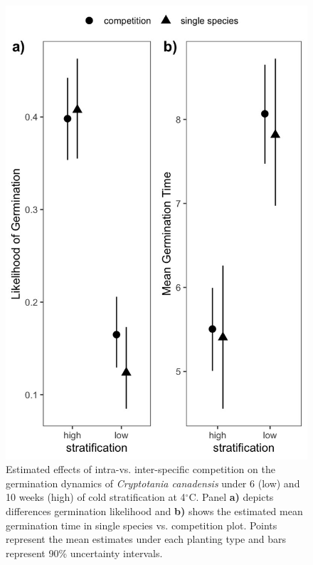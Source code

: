 \documentclass{article}[11pt]
\begin{document}
\begin{figure}[h!]
    \centering
\includegraphics[width=.7\textwidth]{..//figure/nichemodfication.jpeg}
   \caption{Estimated effects of intra-vs. inter-specific competition on the germination dynamics of \textit{Cryptotania canadensis} under 6 (low) and 10 weeks (high) of cold stratification at 4$^{\circ}$C. Panel \textbf{a)} depicts differences germination likelihood and \textbf{b)} shows the estimated mean germination time in single species vs. competition plot. Points represent the mean estimates under each planting type and bars represent 90\% uncertainty intervals. } 
   \label{fig:nichemod}
\end{figure}
\end{document}
